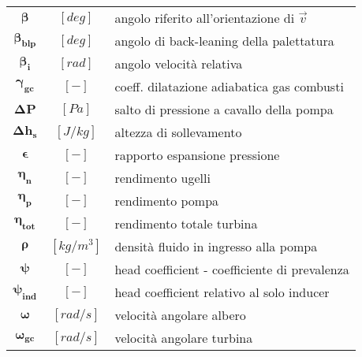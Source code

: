 \begin{multicols}{2}
{\begin{xltabular}{\linewidth}{cc>{\raggedright\arraybackslash}X}
		$\bm{\beta}$ & $[deg]$ & angolo riferito all'orientazione di $\overrightarrow{v}$ \\
        $\bm{\beta_{blp}}$ & $[deg]$ & angolo di back-leaning della palettatura \\
		$\bm{\beta_i}$ & $[rad]$ & angolo velocità relativa \\
		$\bm{\gamma_{gc}}$ & $[-]$ & coeff. dilatazione adiabatica gas combusti \\
        $\bm{\Delta P}$ & $[Pa]$ & salto di pressione a cavallo della pompa \\
        $\bm{\Delta h_s}$ & $[J/kg]$ & altezza di sollevamento \\
		$\bm{\epsilon}$ & $[-]$ & rapporto espansione pressione\\
		$\bm{\eta_n}$ & $[-]$ & rendimento ugelli \\
		$\bm{\eta_p}$ & $[-]$ & rendimento pompa \\
		$\bm{\eta_{tot}}$ & $[-]$ & rendimento totale turbina \\
        $\bm{\rho}$ & $[kg/m^3]$ & densità fluido in ingresso alla pompa \\
        $\bm{\psi}$ & $[-]$ & head coefficient - coefficiente di prevalenza \\
		$\bm{\psi_{ind}}$ & $[-]$ & head coefficient relativo al solo inducer \\
		$\bm{\omega}$ & $[rad/s]$ & velocità angolare albero \\ 
		$\bm{\omega_{gc}}$ & $[rad/s]$ & velocità angolare turbina
	\end{xltabular}
	\unskip
	\unpenalty
	\unpenalty}
	\unvbox\ltmcbox


\end{multicols}
